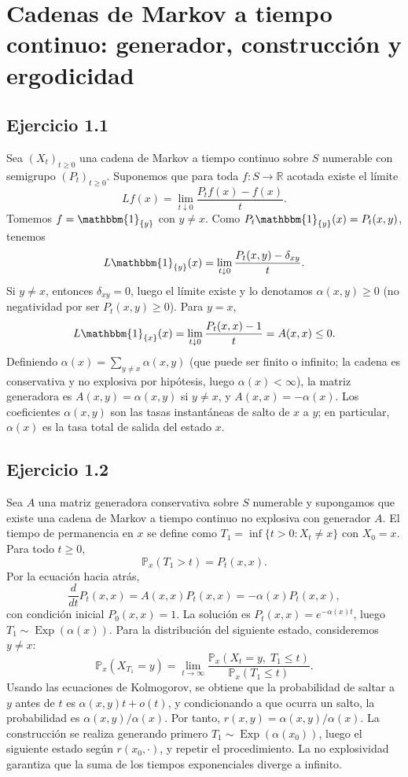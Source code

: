 \documentclass[letterpaper, 12pt]{article}
\renewcommand{\P}{\mathbb{P}}
\newcommand{\R}{\mathbb{R}}
\newcommand{\1}{\mathbbm{1}}
\DeclareMathOperator{\Exp}{Exp}
\begin{document}
    \setlength{\parindent}{0pt}
    \setcounter{page}{1}
    \pagestyle{fancy}
    \thispagestyle{fancy}
    \newpage
    \section{Cadenas de Markov a tiempo continuo: generador, construcci\'on y ergodicidad}

    \subsection{Ejercicio 1.1}
    Sea $(X_t)_{t\ge0}$ una cadena de Markov a tiempo continuo sobre $S$ numerable con semigrupo $(P_t)_{t\ge0}$. Suponemos que para toda $f:S\to\R$ acotada existe el l\'imite
    \[
    Lf(x)=\lim_{t\downarrow0}\frac{P_tf(x)-f(x)}{t}.
    \]
    Tomemos $f=\1_{\{y\}}$ con $y\neq x$. Como $P_t\1_{\{y\}}(x)=P_t(x,y)$, tenemos
    \[
    L\1_{\{y\}}(x)=\lim_{t\downarrow0}\frac{P_t(x,y)-\delta_{xy}}{t}.
    \]
    Si $y\neq x$, entonces $\delta_{xy}=0$, luego el l\'imite existe y lo denotamos $\alpha(x,y)\ge0$ (no negatividad por ser $P_t(x,y)\ge0$). Para $y=x$,
    \[
    L\1_{\{x\}}(x)=\lim_{t\downarrow0}\frac{P_t(x,x)-1}{t}=A(x,x)\le0.
    \]
    Definiendo $\alpha(x)=\sum_{y\neq x}\alpha(x,y)$ (que puede ser finito o infinito; la cadena es conservativa y no explosiva por hip\'otesis, luego $\alpha(x)<\infty$), la matriz generadora es $A(x,y)=\alpha(x,y)$ si $y\neq x$, y $A(x,x)=-\alpha(x)$. Los coeficientes $\alpha(x,y)$ son las tasas instant\'aneas de salto de $x$ a $y$; en particular, $\alpha(x)$ es la tasa total de salida del estado $x$.

    \subsection{Ejercicio 1.2}
    Sea $A$ una matriz generadora conservativa sobre $S$ numerable y supongamos que existe una cadena de Markov a tiempo continuo no explosiva con generador $A$. El tiempo de permanencia en $x$ se define como $T_1=\inf\{t>0:X_t\neq x\}$ con $X_0=x$. Para todo $t\ge0$,
    \[
    \P_x(T_1>t)=P_t(x,x).
    \]
    Por la ecuaci\'on hacia atr\'as,
    \[
    \frac{d}{dt}P_t(x,x)=A(x,x)P_t(x,x)=-\alpha(x)P_t(x,x),
    \]
    con condici\'on inicial $P_0(x,x)=1$. La soluci\'on es $P_t(x,x)=e^{-\alpha(x)t}$, luego $T_1\sim\Exp(\alpha(x))$. Para la distribuci\'on del siguiente estado, consideremos $y\neq x$:
    \[
    \P_x(X_{T_1}=y)=\lim_{t\to\infty}\frac{\P_x(X_t=y,\;T_1\le t)}{\P_x(T_1\le t)}.
    \]
    Usando las ecuaciones de Kolmogorov, se obtiene que la probabilidad de saltar a $y$ antes de $t$ es $\alpha(x,y)t+o(t)$, y condicionando a que ocurra un salto, la probabilidad es $\alpha(x,y)/\alpha(x)$. Por tanto, $r(x,y)=\alpha(x,y)/\alpha(x)$. La construcci\'on se realiza generando primero $T_1\sim\Exp(\alpha(x_0))$, luego el siguiente estado seg\'un $r(x_0,\cdot)$, y repetir el procedimiento. La no explosividad garantiza que la suma de los tiempos exponenciales diverge a infinito.
\end{document}
